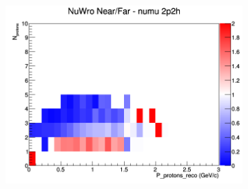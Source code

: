 \documentclass[12pt]{article}
\begin{document}
\begin{figure}[h]
\begin{subfigure}[b]{0.32\textwidth}
\includegraphics[width=\linewidth]{eff_N_P/FGT/protons/ratios/2p2h_NuWro_numu_NF_N_P.png}
\end{subfigure}


\end{figure}
\end{document}
